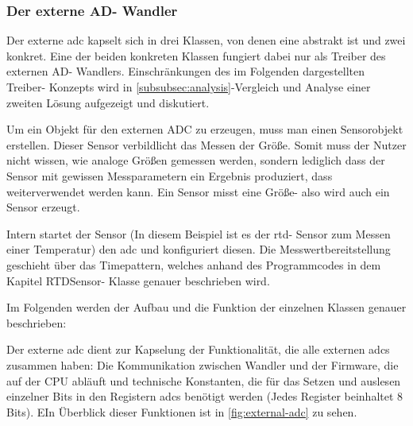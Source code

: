 \subsubsection{Der externe AD- Wandler}
\label{subsubsec:external-adc-software}
Der externe \ac{adc} kapselt sich in drei Klassen, von denen eine abstrakt ist und zwei konkret.
Eine der beiden konkreten Klassen fungiert dabei nur als Treiber des externen AD- Wandlers.
Einschränkungen des im Folgenden dargestellten Treiber- Konzepts wird in \autoref{subsubsec:analysis}-Vergleich und Analyse einer zweiten Lösung aufgezeigt und diskutiert.

Um ein Objekt für den externen ADC zu erzeugen, muss man einen Sensorobjekt erstellen.
Dieser Sensor verbildlicht das Messen der Größe.
Somit muss der Nutzer nicht wissen, wie analoge Größen gemessen werden, sondern lediglich dass der Sensor mit gewissen Messparametern ein Ergebnis produziert, dass weiterverwendet werden kann.
Ein Sensor misst eine Größe- also wird auch ein Sensor erzeugt.

Intern startet der Sensor (In diesem Beispiel ist es der \ac{rtd}- Sensor zum Messen einer Temperatur) den \ac{adc} und konfiguriert diesen.
Die Messwertbereitstellung geschieht über das Timepattern, welches anhand des Programmcodes in dem Kapitel RTDSensor- Klasse genauer beschrieben wird.

Im Folgenden werden der Aufbau und die Funktion der einzelnen Klassen genauer beschrieben:

Der externe \ac{adc} dient zur Kapselung der Funktionalität, die alle externen \ac{adc}s zusammen haben: Die Kommunikation zwischen Wandler und der Firmware, die auf der CPU abläuft und technische Konstanten, die für das Setzen und auslesen einzelner Bits in den Registern \ac{adc}s benötigt werden (Jedes Register beinhaltet 8 Bits).
EIn Überblick dieser Funktionen ist in \autoref{fig:external-adc} zu sehen.

